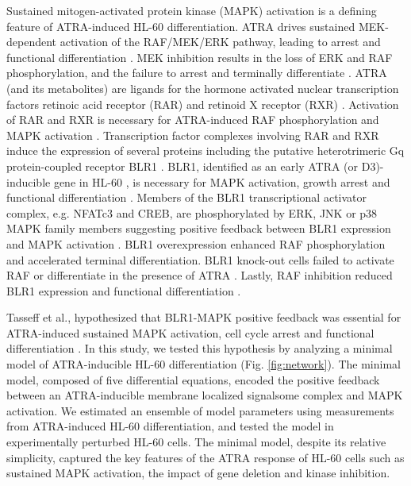 \documentclass[10pt,twocolumn,twoside,final]{IEEEtran}
\begin{document}
Sustained mitogen-activated protein kinase (MAPK) activation is a defining feature of ATRA-induced HL-60 differentiation.
ATRA drives sustained MEK-dependent activation of the RAF/MEK/ERK pathway, leading to arrest and functional differentiation \cite{Yen1998}.
MEK inhibition results in the loss of ERK and RAF phosphorylation, and the failure to arrest and terminally differentiate \cite{Yen1998,Hong2001}.
ATRA (and its metabolites) are ligands for the hormone activated nuclear transcription factors retinoic acid receptor (RAR) and retinoid X receptor (RXR) \cite{Mangelsdorf1990}.
Activation of RAR and RXR is necessary for ATRA-induced RAF phosphorylation and MAPK activation \cite{Hong2001}.
Transcription factor complexes involving RAR and RXR induce the expression of several proteins
including the putative heterotrimeric Gq protein-coupled receptor BLR1 \cite{WANG2004}.
BLR1, identified as an early ATRA (or D3)-inducible gene in HL-60 \cite{YEN1990},
is necessary for MAPK activation, growth arrest and functional differentiation \cite{WANG2004}.
Members of the BLR1 transcriptional activator complex, e.g. NFATc3 and CREB,
are phosphorylated by ERK, JNK or p38 MAPK family members suggesting positive feedback between BLR1 expression and MAPK activation \cite{Yang2002}.
BLR1 overexpression enhanced RAF phosphorylation and accelerated terminal differentiation.
BLR1 knock-out cells failed to activate RAF or differentiate in the presence of ATRA \cite{Wang2008}.
Lastly, RAF inhibition reduced BLR1 expression and functional differentiation \cite{Wang2008}.

Tasseff et al., hypothesized that BLR1-MAPK positive feedback was essential for ATRA-induced sustained MAPK activation,
cell cycle arrest and functional differentiation \cite{Tasseff2011}.
In this study, we tested this hypothesis by analyzing a minimal model of ATRA-inducible HL-60 differentiation (Fig. \ref{fig:network}).
The minimal model, composed of five differential equations, encoded the positive feedback between an ATRA-inducible
membrane localized signalsome complex and MAPK activation.
We estimated an ensemble of model parameters using measurements from ATRA-induced HL-60 differentiation,
and tested the model in experimentally perturbed HL-60 cells.
The minimal model, despite its relative simplicity, captured the key features of the ATRA response of HL-60 cells such as
sustained MAPK activation, the impact of gene deletion and kinase inhibition.

\end{document}
